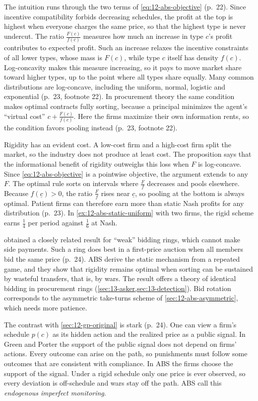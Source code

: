 The intuition runs through the two terms of \eqref{eq:12-abs-objective} (p.~22). Since incentive compatibility forbids
decreasing schedules, the profit at the top is highest when everyone charges the same price, so that the highest type
is never undercut. The ratio $\frac{F(c)}{f(c)}$ measures how much an increase in type $c$'s profit contributes to
expected profit. Such an increase relaxes the incentive constraints of all lower types, whose mass is $F(c)$, while
type $c$ itself has density $f(c)$. Log-concavity makes this measure increasing, so it pays to move market share toward higher types,
up to the point where all types share equally. Many common distributions are log-concave, including the uniform,
normal, logistic and exponential (p.~23, footnote 22). In procurement theory the same condition makes optimal
contracts fully sorting, because a principal minimizes the agent's ``virtual cost'' $c + \frac{F(c)}{f(c)}$. Here
the firms maximize their own information rents, so the condition favors pooling instead (p.~23, footnote 22).

Rigidity has an evident cost. A low-cost firm and a high-cost firm split the market, so the industry does not produce
at least cost. The proposition says that the informational benefit of rigidity outweighs this loss when $F$ is
log-concave. Since \eqref{eq:12-abs-objective} is a pointwise objective, the argument extends to any $F$. The optimal
rule sorts on intervals where $\frac{F}{f}$ decreases and pools elsewhere. Because $f(\underline c) > 0$, the ratio
$\frac{F}{f}$ rises near $\underline c$, so pooling at the bottom is always optimal. Patient firms can therefore earn
more than static Nash profits for any distribution (p.~23). In \cref{ex:12-abs-static-uniform} with two firms, the
rigid scheme earns $\frac{1}{4}$ per period against $\frac{1}{6}$ at Nash.

\citet{McAfeeMcMillan1992} obtained a closely related result for ``weak'' bidding rings, which cannot make side
payments. Such a ring does best in a first-price auction when all members bid the same price (p.~24). ABS derive the
static mechanism from a repeated game, and they show that rigidity remains optimal when sorting can be sustained by
wasteful transfers, that is, by wars. The result offers a theory of identical bidding in procurement rings
(\cref{sec:13-asker,sec:13-detection}). Bid rotation corresponds to the asymmetric take-turns scheme of
\cref{sec:12-abs-asymmetric}, which needs more patience.

The contrast with \cref{sec:12-gp-original} is stark (p.~24). One can view a firm's schedule $p(c)$ as its hidden action
and the realized price as a public signal. In Green and Porter the support of the public signal does not depend on
firms' actions. Every outcome can arise on the path, so punishments must follow some outcomes that are consistent
with compliance. In ABS the firms choose the support of the signal. Under a rigid schedule only one price is ever
observed, so every deviation is off-schedule and wars stay off the path. ABS call this \emph{endogenous imperfect
monitoring}.

